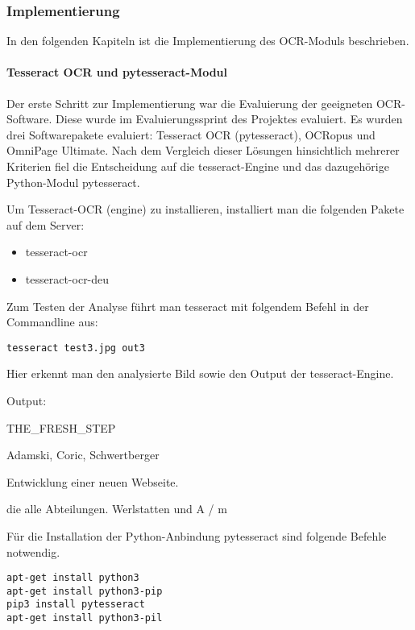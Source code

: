 \subsubsection{Implementierung}
In den folgenden Kapiteln ist die Implementierung des OCR-Moduls beschrieben.
\paragraph{Tesseract OCR und pytesseract-Modul}
Der erste Schritt zur Implementierung war die Evaluierung der geeigneten OCR-Software. Diese wurde im Evaluierungssprint des Projektes evaluiert. Es wurden drei Softwarepakete evaluiert: Tesseract OCR (pytesseract), OCRopus und OmniPage Ultimate. Nach dem Vergleich dieser Lösungen hinsichtlich mehrerer Kriterien fiel die Entscheidung auf die tesseract-Engine und das dazugehörige Python-Modul pytesseract.

Um Tesseract-OCR (engine) zu installieren, installiert man die folgenden Pakete auf dem Server:
\begin{itemize}
\item tesseract-ocr
\item tesseract-ocr-deu
\end{itemize}

\newpage

Zum Testen der Analyse führt man tesseract mit folgendem Befehl in der Commandline aus:
\begin{lstlisting}[caption={tesseract-Ausführung}]
tesseract test3.jpg out3
\end{lstlisting}
\cite{TESS1} \cite{TESS2}

Hier erkennt man den analysierte Bild sowie den Output der tesseract-Engine.


Output:

THE\_FRESH\_STEP

Adamski, Coric, Schwertberger

Entwicklung einer neuen Webseite.

die alle Abteilungen. Werlstatten und A / m

Für die Installation der Python-Anbindung pytesseract sind folgende Befehle notwendig.

\begin{lstlisting}[caption={pytesseract-Installation}]
apt-get install python3
apt-get install python3-pip
pip3 install pytesseract
apt-get install python3-pil
\end{lstlisting}
\cite{PYTES} \cite{PYTES2} \cite{PYTES3}

